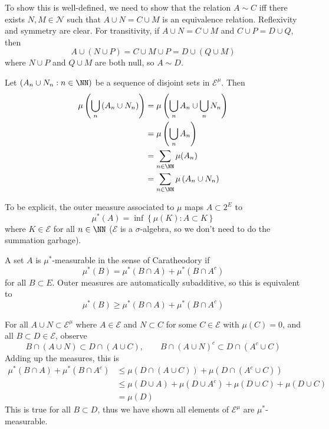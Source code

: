 \documentclass[11pt, headheight=30pt]{scrartcl}
\begin{document}
\begin{psec*}
    To show this is well-defined, we need to show that the relation $A\sim C$
    iff there exists $N, M\in \mathcal{N}$ such that $A\cup N = C\cup M$ is an equivalence
    relation. Reflexivity and symmetry are clear. For transitivity, if
    $A\cup N = C\cup M$ and $C\cup P = D\cup Q$, then
    \[
        A\cup \left(N \cup P\right) = C\cup M \cup P = D\cup \left(Q \cup M\right)
    \]
    where $N\cup P$ and $Q\cup M$ are both null, so $A\sim D$.
\end{psec*}

\begin{psec*}
    Let $(A_n\cup N_n : n\in \NN)$ be a sequence of disjoint sets in $\mathcal{E}^\mu$.
    Then
    \begin{align*}
        \mu\left(\bigcup_n \left(A_n\cup N_n\right)\right) &= \mu\left(\bigcup_n A_n \cup \bigcup_n N_n\right)\\
        &= \mu\left(\bigcup_n A_n\right)\\
        &= \sum_{n\in \NN} \mu(A_n)\\
        &= \sum_{n\in \NN} \mu\left(A_n\cup N_n\right)
    \end{align*}
\end{psec*}

To be explicit, the outer measure associated to $\mu$
maps $A\subset 2^E$ to
\[
    \mu^*(A) = \inf\left\{\mu(K): A\subset K\right\}    
\]
where $K \in \mathcal{E}$ for all $n\in \NN$ ($\mathcal{E}$ is a
$\sigma$-algebra, so we don't need to do the summation garbage).

A set $A$ is $\mu^*$-measurable in the sense of Caratheodory if
\[
    \mu^*(B) = \mu^*(B\cap A) + \mu^*(B\cap A^c)
\]
for all $B\subset E$. Outer measures are automatically subadditive,
so this is equivalent to 
\[
    \mu^*(B) \geq \mu^*(B\cap A) + \mu^*(B\cap A^c)
\]


\begin{psec*}
    For all $A\cup N\subset \mathcal{E}^\mu$ where $A\in \mathcal{E}$
    and $N\subset C$ for some $C\in \mathcal{E}$ with $\mu(C) = 0$,
    and all $B\subset D\in \mathcal{E}$, observe
    \[
        B\cap (A\cup N)\subset D\cap (A\cup C),\qquad B\cap (A\cup N)^c\subset D\cap (A^c\cup C)
    \]
    Adding up the measures, this is
    \begin{align*}
        \mu^*(B\cap A) + \mu^*(B\cap A^c)&\leq \mu(D\cap (A\cup C)) + \mu(D\cap (A^c\cup C))\\
        &\leq \mu(D\cup A) + \mu(D\cup A^c) + \mu(D\cup C) + \mu(D \cup C)\\
        &= \mu(D)
    \end{align*}
    This is true for all $B\subset D$, thus we have shown all elements of $\mathcal{E}^\mu$
    are $\mu^*$-measurable.
\end{psec*}
\end{document}

